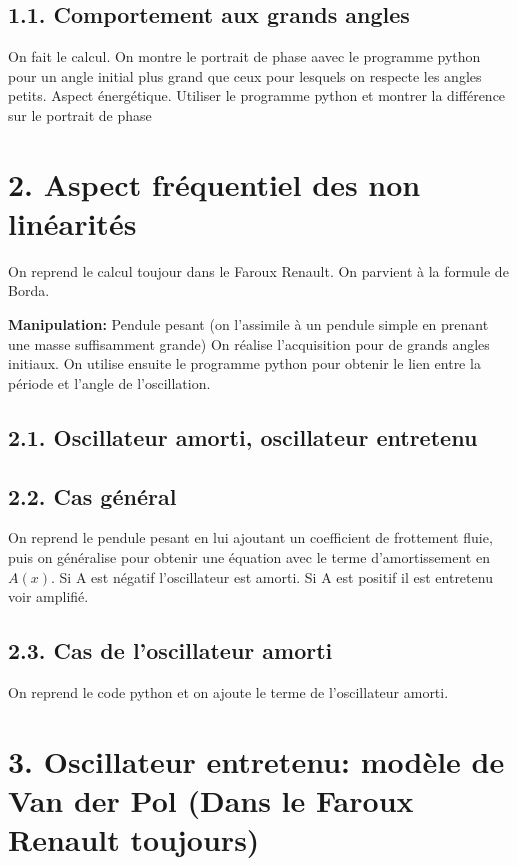 \documentclass[french, a4paper, 10pt, twocolumn, landscape]{article}
\begin{document}
\subsection*{1.1. Comportement aux grands angles}

On fait le calcul. On montre le portrait de phase aavec le programme python pour un angle initial plus grand que ceux pour lesquels on respecte les angles petits. Aspect énergétique. Utiliser le programme python et montrer la différence sur le portrait de phase

\section*{2. Aspect fréquentiel des non linéarités}

On reprend le calcul toujour dans le Faroux Renault. On parvient à la formule de Borda.

\textbf{Manipulation:} Pendule pesant (on l'assimile à un pendule simple en prenant une masse suffisamment grande) On réalise l'acquisition pour de grands angles initiaux. On utilise ensuite le programme python pour obtenir le lien entre la période et l'angle de l'oscillation.

\subsection*{2.1. Oscillateur amorti, oscillateur entretenu}

\subsection*{2.2. Cas général}

On reprend le pendule pesant en lui ajoutant un coefficient de frottement fluie, puis on généralise pour obtenir une équation avec le terme d'amortissement en $A(x)$. Si A est négatif l'oscillateur est amorti. Si A est positif il est entretenu voir amplifié.

\subsection*{2.3. Cas de l'oscillateur amorti}

On reprend le code python et on ajoute le terme de l'oscillateur amorti.

\section*{3. Oscillateur entretenu: modèle de Van der Pol (Dans le Faroux Renault toujours)}
\end{document}

